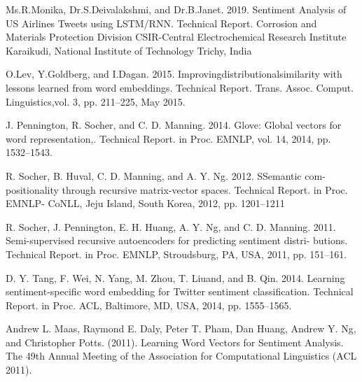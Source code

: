 \documentclass[sigplan,screen]{acmart}
\begin{document}
\begin{thebibliography}{1}
Ms.R.Monika, Dr.S.Deivalakshmi, and Dr.B.Janet. 2019. Sentiment
Analysis of US Airlines Tweets using LSTM/RNN. Technical Report. Corrosion and Materials Protection Division CSIR-Central Electrochemical
Research Institute Karaikudi, National Institute of Technology Trichy,
India

O.Lev, Y.Goldberg, and I.Dagan. 2015. Improvingdistributionalsimilarity
with lessons learned from word embeddings. Technical Report. Trans.
Assoc. Comput. Linguistics,vol. 3, pp. 211–225, May 2015.

J. Pennington, R. Socher, and C. D. Manning. 2014. Glove: Global vectors
for word representation,. Technical Report. in Proc. EMNLP, vol. 14,
2014, pp. 1532–1543.

R. Socher, B. Huval, C. D. Manning, and A. Y. Ng. 2012. SSemantic
com- positionality through recursive matrix-vector spaces. Technical
Report. in Proc. EMNLP- CoNLL, Jeju Island, South Korea, 2012, pp.
1201–1211

R. Socher, J. Pennington, E. H. Huang, A. Y. Ng, and C. D. Manning.
2011. Semi-supervised recursive autoencoders for predicting sentiment
distri- butions. Technical Report. in Proc. EMNLP, Stroudsburg, PA,
USA, 2011, pp. 151–161.

 D. Y. Tang, F. Wei, N. Yang, M. Zhou, T. Liuand, and B. Qin. 2014.
Learning sentiment-specific word embedding for Twitter sentiment classification. Technical Report. in Proc. ACL, Baltimore, MD, USA, 2014,
pp. 1555–1565.

Andrew L. Maas, Raymond E. Daly, Peter T. Pham, Dan Huang, Andrew Y. Ng, and Christopher Potts. (2011). Learning Word Vectors for Sentiment Analysis. The 49th Annual Meeting of the Association for Computational Linguistics (ACL 2011).


\end{thebibliography}









\appendix
\end{document}
